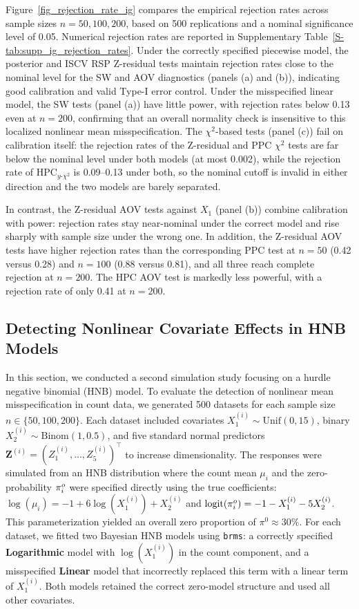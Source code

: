 Figure~\ref{fig_rejection_rate_ig} compares the empirical rejection rates across sample sizes $n=50,100,200$, based on 500 replications and a nominal significance level of 0.05. Numerical rejection rates are reported in Supplementary Table~\ref{S-tab:supp_ig_rejection_rates}. Under the correctly specified piecewise model, the posterior and ISCV RSP Z-residual tests maintain rejection rates close to the nominal level for the SW and AOV diagnostics (panels (a) and (b)), indicating good calibration and valid Type-I error control. Under the misspecified linear model, the SW tests (panel (a)) have little power, with rejection rates below 0.13 even at $n=200$, confirming that an overall normality check is insensitive to this localized nonlinear mean misspecification. The $\chi^2$-based tests (panel (c)) fail on calibration itself: the rejection rates of the Z-residual and PPC $\chi^2$ tests are far below the nominal level under both models (at most 0.002), while the rejection rate of HPC$_{y\text{-}\chi^2}$ is 0.09--0.13 under both, so the nominal cutoff is invalid in either direction and the two models are barely separated. 

In contrast, the Z-residual AOV tests against $X_1$ (panel (b)) combine calibration with power: rejection rates stay near-nominal under the correct model and rise sharply with sample size under the wrong one. In addition, the Z-residual AOV tests have higher rejection rates than the corresponding PPC test at $n=50$ (0.42 versus 0.28) and $n=100$ (0.88 versus 0.81), and all three reach complete rejection at $n=200$. The HPC AOV test is markedly less powerful, with a rejection rate of only 0.41 at $n=200$. 

\subsection{Detecting Nonlinear Covariate Effects in HNB Models}\label{sec:sim-nl}


In this section, we conducted a second simulation study focusing on a hurdle negative binomial (HNB) model. To evaluate the detection of nonlinear mean misspecification in count data, we generated 500 datasets for each sample size $n\in\{50,100,200\}$. Each dataset included covariates $X_1^{(i)} \sim \mathrm{Unif}(0,15)$, binary $X_2^{(i)} \sim \mathrm{Binom}(1,0.5)$, and five standard normal predictors $\bm{Z}^{(i)} = (Z_1^{(i)},\dots,Z_5^{(i)})^\top$ to increase dimensionality. The responses were simulated from an HNB distribution where the count mean $\mu_i$ and the zero-probability $\pi^o_{i}$ were specified directly using the true coefficients: $\log(\mu_i) = -1 + 6\log(X_1^{(i)}) + X_2^{(i)}$ and $\mathrm{logit}(\pi^o_{i}) = -1 - X_1^{(i)} - 5X_2^{(i)}$. This parameterization yielded an overall zero proportion of $\pi^0 \approx 30\%$. For each dataset, we fitted two Bayesian HNB models using \texttt{brms}: a correctly specified \textbf{Logarithmic} model with $\log(X_1^{(i)})$ in the count component, and a misspecified \textbf{Linear} model that incorrectly replaced this term with a linear term of $X_1^{(i)}$. Both models retained the correct zero-model structure and used all other covariates.

